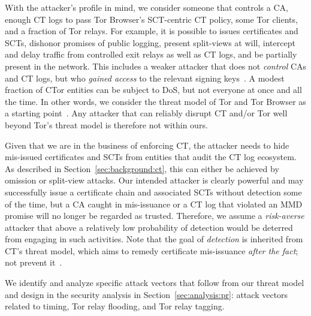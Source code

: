 With
the attacker's profile in mind, we consider someone that controls
	a CA,
	enough CT logs to pass Tor Browser's SCT-centric CT policy, 
	some Tor clients, and
	a fraction of Tor relays.
For example, it is possible to
	issues certificates and SCTs,
	dishonor promises of public logging,
	present split-views at will,
	intercept and delay traffic from controlled exit relays as well as CT logs,
		and
	be partially present in the network.
This includes a weaker attacker that does not \emph{control} CAs and CT logs,
but who \emph{gained access} to the relevant signing keys~\cite{turktrust,%
gdca1-omission}.  A modest fraction of CTor entities can be subject to DoS, but
not everyone at once and all the time.  In other words, we consider the threat
model of Tor and Tor Browser as a starting point~\cite{tor,tor-browser}.  Any
attacker that can reliably disrupt CT and/or Tor well beyond Tor's threat
model is therefore not within ours.

%
%
Given that we are in the business of enforcing CT, the attacker needs to hide
mis-issued certificates and SCTs from entities that audit the CT log ecosystem.
As described in Section~\ref{sec:background:ct}, this can either be achieved by
omission or split-view attacks.  Our intended attacker is clearly powerful and
may successfully issue a certificate chain and associated SCTs without detection
some of the time, but a CA caught in mis-issuance or a CT log that violated an
MMD promise will no longer be regarded as trusted.  Therefore, we assume a
\emph{risk-averse} attacker that above a relatively low probability of detection
would be deterred from engaging in such activities. Note that the goal of
\emph{detection} is inherited from CT's threat model, which aims to remedy
certificate mis-issuance \emph{after the fact}; not prevent it~\cite{ct/a}.

%
%
We identify and analyze specific attack vectors that follow from our threat
model and design in the security analysis in Section~\ref{sec:analysis:pr}:
attack vectors related to timing, Tor relay flooding, and Tor relay tagging.


